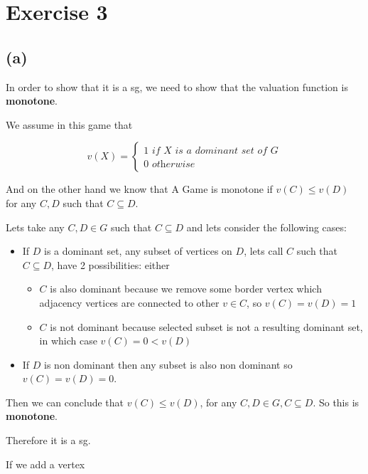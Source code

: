 \documentclass[12pt, a4paper]{article}
\begin{document}
\section{Exercise 3}
\subsection{(a)}
In order to show that it is a \acrfull{sg}, we need to show that the valuation function is \textbf{monotone}.

We assume in this game that

\[ v(X) = \begin{cases}
  1 \textit{ if X is a dominant set of G}\\
  0 \textit{ otherwise}
\end{cases}
\]

And on the other hand we know that A Game is monotone if $v(C) \leq v(D)$ for any $C, D$ such that $C \subseteq D$.

Lets take any $C,D \in G$ such that $C \subseteq D$ and lets consider the following cases:

\begin{itemize}
  \item If $D$ is a dominant set, any subset of vertices on $D$, lets call $C$ such that $C \subseteq D$, have 2 possibilities: either
  \begin{itemize}
    \item $C$ is also dominant because we remove some border vertex which adjacency vertices are connected to other $v \in C$, so $v(C) = v(D) = 1$
    \item $C$ is not dominant because selected subset is not a resulting dominant set, in which case $v(C) = 0 < v(D)$
  \end{itemize}
  \item If $D$ is non dominant then any subset is also non dominant so $v(C) = v(D) = 0$.
\end{itemize}

Then we can conclude that $v(C) \leq v(D)$, for any $C, D \in G, C \subseteq D$. So this is \textbf{monotone}.

Therefore it is a \acrshort{sg}.

If we add a vertex 
\end{document}
